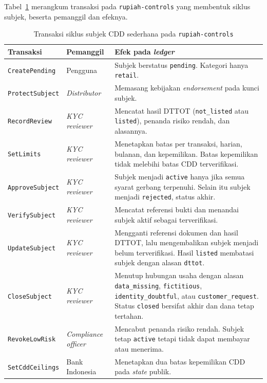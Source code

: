 Tabel~\ref{tab:ch3-cdd-transaksi} merangkum transaksi pada \texttt{rupiah-controls} yang membentuk siklus subjek, beserta pemanggil dan efeknya.

\begin{table}[H]
    \caption{Transaksi siklus subjek CDD sederhana pada \texttt{rupiah-controls}}
    \label{tab:ch3-cdd-transaksi}
    \centering
    \small
    \begin{tabular}{@{}p{3.5cm}p{2.5cm}p{7.2cm}@{}}
        \toprule
        \textbf{Transaksi} & \textbf{Pemanggil} & \textbf{Efek pada \textit{ledger}} \\
        \midrule
        \texttt{CreatePending} & Pengguna & Subjek berstatus \texttt{pending}. Kategori hanya \texttt{retail}. \\
        \texttt{ProtectSubject} & \textit{Distributor} & Memasang kebijakan \textit{endorsement} pada kunci subjek. \\
        \texttt{RecordReview} & \textit{KYC reviewer} & Mencatat hasil DTTOT (\texttt{not\_listed} atau \texttt{listed}), penanda risiko rendah, dan alasannya. \\
        \texttt{SetLimits} & \textit{KYC reviewer} & Menetapkan batas per transaksi, harian, bulanan, dan kepemilikan. Batas kepemilikan tidak melebihi batas CDD terverifikasi. \\
        \texttt{ApproveSubject} & \textit{KYC reviewer} & Subjek menjadi \texttt{active} hanya jika semua syarat gerbang terpenuhi. Selain itu subjek menjadi \texttt{rejected}, status akhir. \\
        \texttt{VerifySubject} & \textit{KYC reviewer} & Mencatat referensi bukti dan menandai subjek aktif sebagai terverifikasi. \\
        \texttt{UpdateSubject} & \textit{KYC reviewer} & Mengganti referensi dokumen dan hasil DTTOT, lalu mengembalikan subjek menjadi belum terverifikasi. Hasil \texttt{listed} membatasi subjek dengan alasan \texttt{dttot}. \\
        \texttt{CloseSubject} & \textit{KYC reviewer} & Menutup hubungan usaha dengan alasan \texttt{data\_\allowbreak missing}, \texttt{fictitious}, \texttt{identity\_\allowbreak doubtful}, atau \texttt{customer\_\allowbreak request}. Status \texttt{closed} bersifat akhir dan dana tetap tertahan. \\
        \texttt{RevokeLowRisk} & \textit{Compliance officer} & Mencabut penanda risiko rendah. Subjek tetap \texttt{active} tetapi tidak dapat membayar atau menerima. \\
        \texttt{SetCddCeilings} & Bank Indonesia & Menetapkan dua batas kepemilikan CDD pada \textit{state} publik. \\
        \bottomrule
    \end{tabular}
\end{table}

